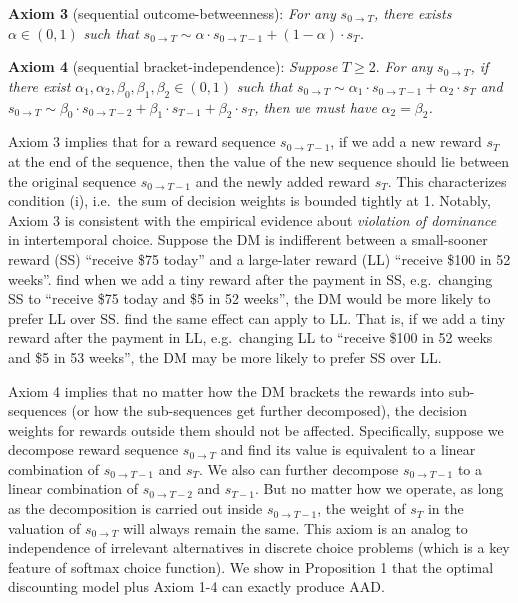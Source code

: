 \documentclass[
  12pt,
]{article}
\begin{document}
\noindent \textbf{Axiom 3} (sequential outcome-betweenness): \emph{For
any} \(s_{0\rightarrow T}\)\emph{, there exists} \(\alpha\in(0,1)\)
\emph{such that}
\(s_{0\rightarrow T} \sim \alpha\cdot s_{0\rightarrow T-1}+(1-\alpha) \cdot s_T\)\emph{.}

\noindent \textbf{Axiom 4} (sequential bracket-independence):
\emph{Suppose} \(T\geq 2\). \emph{For any} \(s_{0\rightarrow T}\)\emph{,
if there exist} \(\alpha_1,\alpha_2,\beta_0,\beta_1,\beta_2\in(0,1)\)
\emph{such that}
\(s_{0\rightarrow T}\sim \alpha_1 \cdot s_{0\rightarrow T-1} + \alpha_2 \cdot s_{T}\)
\emph{and}
\(s_{0\rightarrow T}\sim \beta_0 \cdot s_{0\rightarrow T-2}+\beta_1 \cdot s_{T-1}+\beta_2 \cdot s_{T}\)\emph{,
then we must have} \(\alpha_2 = \beta_2\)\emph{.}

Axiom 3 implies that for a reward sequence \(s_{0\rightarrow T-1}\), if
we add a new reward \(s_T\) at the end of the sequence, then the value
of the new sequence should lie between the original sequence
\(s_{0\rightarrow T-1}\) and the newly added reward \(s_T\). This
characterizes condition (i), i.e.~the sum of decision weights is bounded
tightly at 1. Notably, Axiom 3 is consistent with the empirical evidence
about \emph{violation of dominance}
\citep{scholten2014better, jiang2017better} in intertemporal choice.
Suppose the DM is indifferent between a small-sooner reward (SS)
``receive \$75 today'' and a large-later reward (LL) ``receive \$100 in
52 weeks''. \citet{scholten2014better} find when we add a tiny reward
after the payment in SS, e.g.~changing SS to ``receive \$75 today and
\$5 in 52 weeks'', the DM would be more likely to prefer LL over SS.
\citet{jiang2017better} find the same effect can apply to LL. That is,
if we add a tiny reward after the payment in LL, e.g.~changing LL to
``receive \$100 in 52 weeks and \$5 in 53 weeks'', the DM may be more
likely to prefer SS over LL.

Axiom 4 implies that no matter how the DM brackets the rewards into
sub-sequences (or how the sub-sequences get further decomposed), the
decision weights for rewards outside them should not be affected.
Specifically, suppose we decompose reward sequence
\(s_{0\rightarrow T}\) and find its value is equivalent to a linear
combination of \(s_{0\rightarrow T-1}\) and \(s_T\). We also can further
decompose \(s_{0\rightarrow T-1}\) to a linear combination of
\(s_{0\rightarrow T-2}\) and \(s_{T-1}\). But no matter how we operate,
as long as the decomposition is carried out inside
\(s_{0\rightarrow T-1}\), the weight of \(s_T\) in the valuation of
\(s_{0\rightarrow T}\) will always remain the same. This axiom is an
analog to independence of irrelevant alternatives in discrete choice
problems (which is a key feature of softmax choice function). We show in
Proposition 1 that the optimal discounting model plus Axiom 1-4 can
exactly produce AAD.
\end{document}
